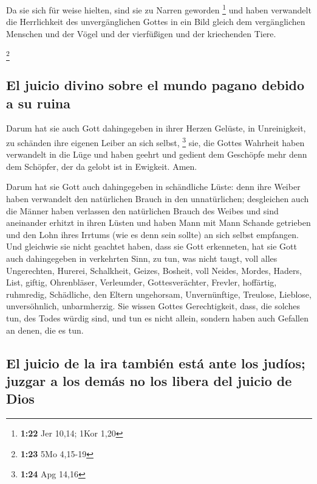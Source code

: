  Da sie sich für weise hielten, sind sie zu Narren
geworden \footnote{\textbf{1:22} Jer 10,14; 1Kor 1,20} 
und haben verwandelt die Herrlichkeit des unvergänglichen Gottes in ein
Bild gleich dem vergänglichen Menschen und der Vögel und der vierfüßigen
und der kriechenden Tiere.

\footnote{\textbf{1:23} 5Mo 4,15-19}

\hypertarget{el-juicio-divino-sobre-el-mundo-pagano-debido-a-su-ruina}{%
\subsection{El juicio divino sobre el mundo pagano debido a su
ruina}\label{el-juicio-divino-sobre-el-mundo-pagano-debido-a-su-ruina}}

 Darum hat sie auch Gott dahingegeben in ihrer Herzen
Gelüste, in Unreinigkeit, zu schänden ihre eigenen Leiber an sich
selbst, \footnote{\textbf{1:24} Apg 14,16}  sie, die
Gottes Wahrheit haben verwandelt in die Lüge und haben geehrt und
gedient dem Geschöpfe mehr denn dem Schöpfer, der da gelobt ist in
Ewigkeit. Amen.

 Darum hat sie Gott auch dahingegeben in schändliche
Lüste: denn ihre Weiber haben verwandelt den natürlichen Brauch in den
unnatürlichen;  desgleichen auch die Männer haben
verlassen den natürlichen Brauch des Weibes und sind aneinander erhitzt
in ihren Lüsten und haben Mann mit Mann Schande getrieben und den Lohn
ihres Irrtums (wie es denn sein sollte) an sich selbst empfangen.
 Und gleichwie sie nicht geachtet haben, dass sie Gott
erkenneten, hat sie Gott auch dahingegeben in verkehrten Sinn, zu tun,
was nicht taugt,  voll alles Ungerechten, Hurerei,
Schalkheit, Geizes, Bosheit, voll Neides, Mordes, Haders, List, giftig,
Ohrenbläser,  Verleumder, Gottesverächter, Frevler,
hoffärtig, ruhmredig, Schädliche, den Eltern ungehorsam, 
Unvernünftige, Treulose, Lieblose, unversöhnlich, unbarmherzig.
 Sie wissen Gottes Gerechtigkeit, dass, die solches tun,
des Todes würdig sind, und tun es nicht allein, sondern haben auch
Gefallen an denen, die es tun.

\hypertarget{el-juicio-de-la-ira-tambiuxe9n-estuxe1-ante-los-juduxedos-juzgar-a-los-demuxe1s-no-los-libera-del-juicio-de-dios}{%
\subsection{El juicio de la ira también está ante los judíos; juzgar a
los demás no los libera del juicio de
Dios}\label{el-juicio-de-la-ira-tambiuxe9n-estuxe1-ante-los-juduxedos-juzgar-a-los-demuxe1s-no-los-libera-del-juicio-de-dios}}

